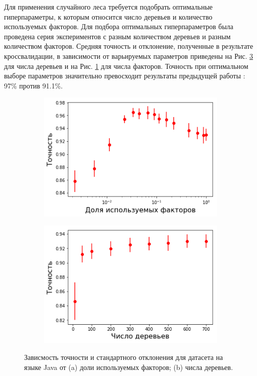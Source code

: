 Для применения случайного леса требуется подобрать оптимальные гиперпараметры, к которым относится число деревьев и количество используемых факторов. Для подбора оптимальных гиперпараметров была проведена серия экспериментов с разным количеством деревьев и разным количеством факторов. Средняя точность и отклонение, полученные в результате кроссвалидации, в зависимости от варьируемых параметров приведены на Рис. \ref{fig:hyper-trees} для числа деревьев и на Рис. \ref{fig:hyper-factors} для числа факторов. Точность при оптимальном выборе параметров значительно превосходит результаты предыдущей работы \cite{Yang2017}: 97\% против 91.1\%.


\begin{figure}[ht]
    \centering
       \begin{subfigure}{0.49\linewidth}
       \centering
       \includegraphics[width=\linewidth]{images/factors.png}
       \caption{}
       \label{fig:hyper-factors} 
    \end{subfigure}
    \hfill
    \begin{subfigure}{0.49\linewidth}
       \centering
       \includegraphics[width=\linewidth]{images/trees.png}
       \caption{}
       \label{fig:hyper-trees}
    \end{subfigure}
    \centering
    \caption{Зависмость точности и стандартного отклонения для датасета на языке Java от (a) доли используемых факторов; (b) числа деревьев.}
    \end{figure}


